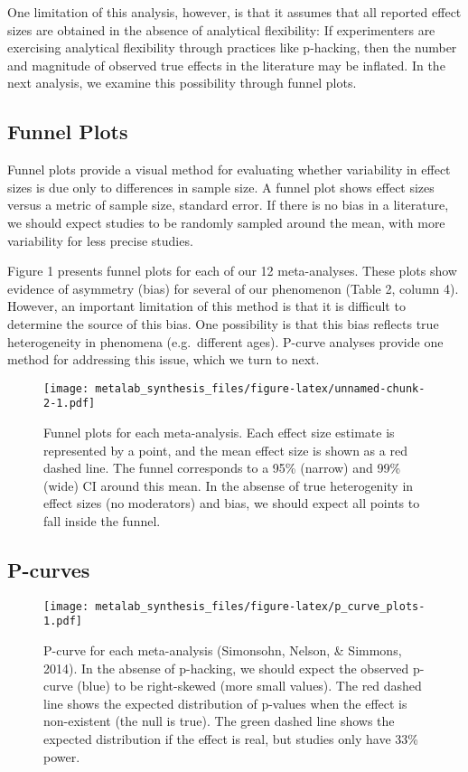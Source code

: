\documentclass[english,floatsintext,man]{apa6}
\begin{document}
One limitation of this analysis, however, is that it assumes that all
reported effect sizes are obtained in the absence of analytical
flexibility: If experimenters are exercising analytical flexibility
through practices like p-hacking, then the number and magnitude of
observed true effects in the literature may be inflated. In the next
analysis, we examine this possibility through funnel plots.

\subsection{Funnel Plots}\label{funnel-plots}

Funnel plots provide a visual method for evaluating whether variability
in effect sizes is due only to differences in sample size. A funnel plot
shows effect sizes versus a metric of sample size, standard error. If
there is no bias in a literature, we should expect studies to be
randomly sampled around the mean, with more variability for less precise
studies.

Figure 1 presents funnel plots for each of our 12 meta-analyses. These
plots show evidence of asymmetry (bias) for several of our phenomenon
(Table 2, column 4). However, an important limitation of this method is
that it is difficult to determine the source of this bias. One
possibility is that this bias reflects true heterogeneity in phenomena
(e.g.~different ages). P-curve analyses provide one method for
addressing this issue, which we turn to next.

\begin{figure}[htbp]
\centering
\texttt{[image: metalab\_synthesis\_files/figure-latex/unnamed-chunk-2-1.pdf]}
\caption{Funnel plots for each meta-analysis. Each effect size estimate
is represented by a point, and the mean effect size is shown as a red
dashed line. The funnel corresponds to a 95\% (narrow) and 99\% (wide)
CI around this mean. In the absense of true heterogenity in effect sizes
(no moderators) and bias, we should expect all points to fall inside the
funnel.}
\end{figure}

\subsection{P-curves}\label{p-curves}

\begin{figure}[htbp]
\centering
\texttt{[image: metalab\_synthesis\_files/figure-latex/p\_curve\_plots-1.pdf]}
\caption{P-curve for each meta-analysis (Simonsohn, Nelson, \& Simmons,
2014). In the absense of p-hacking, we should expect the observed
p-curve (blue) to be right-skewed (more small values). The red dashed
line shows the expected distribution of p-values when the effect is
non-existent (the null is true). The green dashed line shows the
expected distribution if the effect is real, but studies only have 33\%
power.}
\end{figure}
\end{document}
